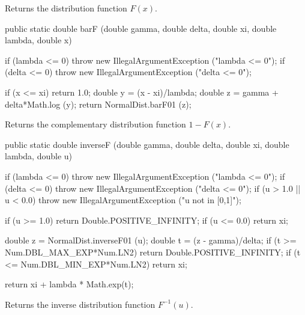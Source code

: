  \begin{tabb}
  Returns the  distribution function $F(x)$.
 \end{tabb}
\begin{code}

   public static double barF (double gamma, double delta,
                              double xi, double lambda, double x)\begin{hide} {
      if (lambda <= 0)
         throw new IllegalArgumentException ("lambda <= 0");
      if (delta <= 0)
         throw new IllegalArgumentException ("delta <= 0");

      if (x <= xi)
         return 1.0;
      double y = (x - xi)/lambda;
      double z = gamma + delta*Math.log (y);
      return NormalDist.barF01 (z);
   }\end{hide}
\end{code}
  \begin{tabb}
  Returns the complementary distribution function $1-F(x)$.
 \end{tabb}
\begin{code}

   public static double inverseF (double gamma, double delta,
                                  double xi, double lambda, double u)\begin{hide} {
      if (lambda <= 0)
         throw new IllegalArgumentException ("lambda <= 0");
      if (delta <= 0)
         throw new IllegalArgumentException ("delta <= 0");
      if (u > 1.0 || u < 0.0)
          throw new IllegalArgumentException ("u not in [0,1]");

      if (u >= 1.0)
         return Double.POSITIVE_INFINITY;
      if (u <= 0.0)
         return xi;

      double z = NormalDist.inverseF01 (u);
      double t = (z - gamma)/delta;
      if (t >= Num.DBL_MAX_EXP*Num.LN2)
         return Double.POSITIVE_INFINITY;
      if (t <= Num.DBL_MIN_EXP*Num.LN2)
         return xi;

      return xi + lambda * Math.exp(t);
   }\end{hide}
\end{code}
  \begin{tabb}
  Returns the inverse distribution function $F^{-1}(u)$.
 \end{tabb}
